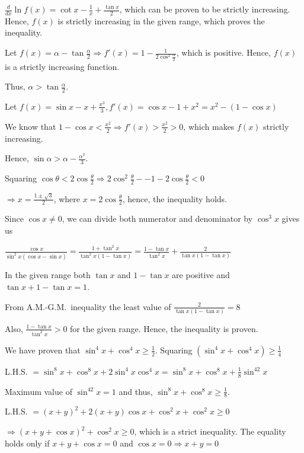   $\frac{d}{dx}\ln f(x) = \cot x - \frac{1}{x} + \frac{\tan x}{2}$, which can be proven to be strictly
  increasing. Hence, $f(x)$ is strictly increasing in the given range, which proves the inequality.
\item Let $f(x) = \alpha - \tan\frac{\alpha}{2}\Rightarrow f'(x) = 1 - \frac{1}{2\cos^2\frac{\alpha}{2}}$,
  which is positive. Hence, $f(x)$ is a strictly increasing function.

  Thus, $\alpha > \tan\frac{\alpha}{2}$.
\item Let $f(x) = \sin x - x + \frac{x^3}{3}, f'(x) = \cos x - 1 + x^2 = x^2 - (1 - \cos x)$

  We know that $1 - \cos x < \frac{x^2}{2} \Rightarrow f'(x) > \frac{x^2}{2} > 0$, which makes $f(x)$
  strictly increasing.

  Hence, $\sin \alpha> \alpha - \frac{\alpha^3}{3}$.
\item Squaring $\cos\theta < 2\cos\frac{\theta}{2}\Rightarrow 2\cos^2\frac{\theta}{2} - -1 -
  2\cos\frac{\theta}{2} < 0$

  $\Rightarrow x = \frac{1\pm\sqrt{3}}{2}$, where $x = 2\cos\frac{\theta}{2}$, hence, the inequality holds.
\item Since $\cos x \neq 0$, we can divide both numerator and denominator by $\cos^3 x$ gives us

  $\frac{\cos x}{\sin^2x(\cos x - \sin x)} = \frac{1 + \tan^2x}{\tan^2x(1 - \tan x)} = \frac{1 - \tan
  x}{\tan^2x} + \frac{2}{\tan x(1 - \tan x)}$

  In the given range both $\tan x$ and $1 - \tan x$ are positive and $\tan x + 1 - \tan x = 1$.

  From A.M.-G.M.\ inequality the least value of $\frac{2}{\tan x(1 - \tan x)} = 8$

  Also, $\frac{1 - \tan x}{\tan^2x} > 0$ for the given range. Hence, the inequality is proven.
\item We have proven that $\sin^4x + \cos^4x\geq \frac{1}{2}$. Squaring $(\sin^4x + \cos^4x)\geq
  \frac{1}{4}$

  L.H.S. $= \sin^8x + \cos^8x + 2\sin^4x\cos^4x = \sin^8x + \cos^8x + \frac{1}{8}\sin^42x$

  Maximum value of $\sin^42x = 1$ and thus, $\sin^8x + \cos^8x \geq \frac{1}{8}$.
\item L.H.S. $= (x + y)^2 + 2(x + y)\cos x + \cos^2 x + \cos^2x\geq 0$

  $\Rightarrow (x + y + \cos x)^2 + \cos^2x \geq 0$, which is a strict inequality. The equality holds only
  if $x + y + \cos x = 0$ and $\cos x = 0\Rightarrow x + y = 0$

